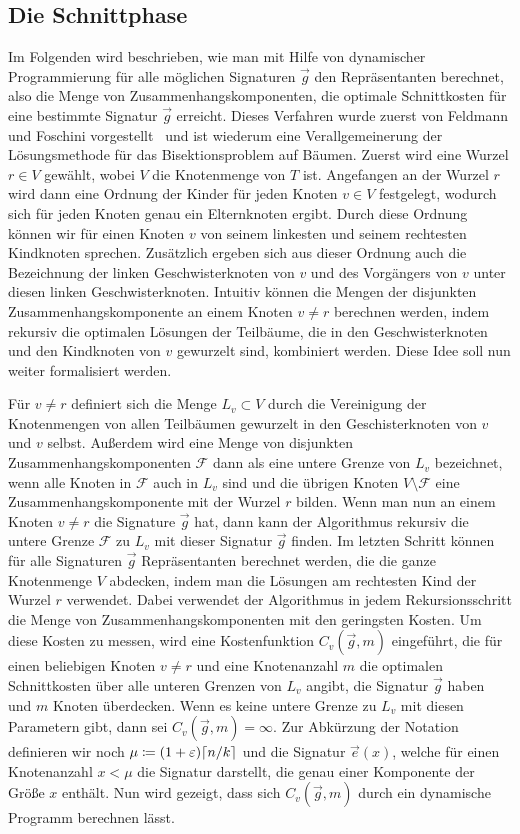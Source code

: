 \subsection{Die Schnittphase}
Im Folgenden wird beschrieben, wie man mit Hilfe von dynamischer Programmierung für alle möglichen Signaturen $\vec{g}$ den Repräsentanten berechnet, also die Menge von Zusammenhangskomponenten, die optimale Schnittkosten für eine bestimmte Signatur $\vec{g}$ erreicht.
Dieses Verfahren wurde zuerst von Feldmann und Foschini vorgestellt~\parencite{ff13} und ist wiederum eine Verallgemeinerung der Lösungsmethode für das Bisektionsproblem auf Bäumen. \parencite{mcg78, ws11}
Zuerst wird eine Wurzel $r \in V$ gewählt, wobei $V$ die Knotenmenge von $T$ ist. 
Angefangen an der Wurzel $r$ wird dann eine Ordnung der Kinder für jeden Knoten $v \in V$ festgelegt, wodurch sich für jeden Knoten genau ein Elternknoten ergibt.
Durch diese Ordnung können wir für einen Knoten $v$ von seinem linkesten und seinem rechtesten Kindknoten sprechen. 
Zusätzlich ergeben sich aus dieser Ordnung auch die Bezeichnung der linken Geschwisterknoten von $v$ und des Vorgängers von $v$ unter diesen linken Geschwisterknoten.
Intuitiv können die Mengen der disjunkten Zusammenhangskomponente an einem Knoten $v \neq r$ berechnen werden, indem rekursiv die optimalen Lösungen der Teilbäume, die in den Geschwisterknoten und den Kindknoten von $v$ gewurzelt sind, kombiniert werden.
Diese Idee soll nun weiter formalisiert werden.

Für $v \neq r$ definiert sich die Menge $L_v \subset V$ durch die Vereinigung der Knotenmengen von allen Teilbäumen gewurzelt in den Geschisterknoten von $v$ und $v$ selbst.
Außerdem wird eine Menge von disjunkten Zusammenhangskomponenten $\mathcal{F}$ dann als eine untere Grenze von $L_v$ bezeichnet, wenn alle Knoten in $\mathcal{F}$ auch in $L_v$ sind und die übrigen Knoten $V \setminus \mathcal{F}$ eine Zusammenhangskomponente mit der Wurzel $r$ bilden.
Wenn man nun an einem Knoten $v \neq r$ die Signature $\vec{g}$ hat, dann kann der Algorithmus rekursiv die untere Grenze $\mathcal{F}$ zu $L_v$ mit dieser Signatur $\vec{g}$ finden.
Im letzten Schritt können für alle Signaturen $\vec{g}$ Repräsentanten berechnet werden, die die ganze Knotenmenge $V$ abdecken, indem man die Lösungen am rechtesten Kind der Wurzel $r$ verwendet.
Dabei verwendet der Algorithmus in jedem Rekursionsschritt die Menge von Zusammenhangskomponenten mit den geringsten Kosten. 
Um diese Kosten zu messen, wird eine Kostenfunktion $C_v(\vec{g}, m)$ eingeführt, die für einen beliebigen Knoten $v \neq r$ und eine Knotenanzahl $m$ die optimalen Schnittkosten über alle unteren Grenzen von $L_v$ angibt, die Signatur $\vec{g}$ haben und $m$ Knoten überdecken.
Wenn es keine untere Grenze zu $L_v$ mit diesen Parametern gibt, dann sei $C_v(\vec{g}, m) = \infty$.
Zur Abkürzung der Notation definieren wir noch $\mu \coloneqq (1+\eps)\ceil*{n/k}$ und die Signatur $\vec{e}(x)$, welche für einen Knotenanzahl $x < \mu$ die Signatur darstellt, die genau einer Komponente der Größe $x$ enthält.
Nun wird gezeigt, dass sich $C_v(\vec{g}, m)$ durch ein dynamische Programm berechnen lässt.

